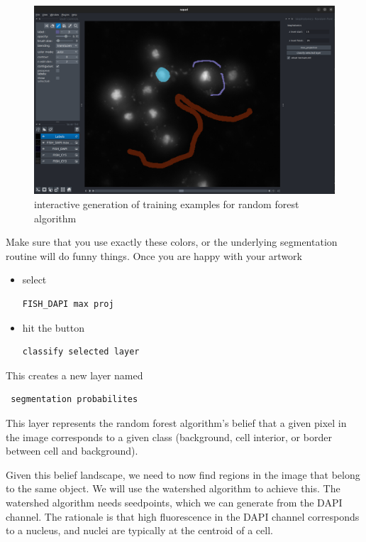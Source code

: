 \documentclass[11pt]{article} %
\begin{document}
\begin{figure}[H]
\includegraphics[width=14cm]{images/napari_viewer_6.png}
\caption{interactive generation of training examples for random forest algorithm}
\end{figure}

Make sure that you use exactly these colors, or the underlying segmentation routine will do funny things.
Once you are happy with your artwork
\begin{itemize}
\item select \begin{verbatim}FISH_DAPI max proj \end{verbatim}   
\item hit the button \begin{verbatim}classify selected layer\end{verbatim} 
\end{itemize}

This creates a new layer named \begin{verbatim} segmentation probabilites \end{verbatim}
This layer represents the random forest algorithm's belief that a given pixel in the image corresponds to a given class (background, cell interior, or border between cell and background).

Given this belief landscape, we need to now find regions in the image that belong to the same object. 
We will use the watershed algorithm to achieve this. 
The watershed algorithm needs seedpoints, which we can generate from the DAPI channel.
The rationale is that high fluorescence in the DAPI channel corresponds to a nucleus, and nuclei are typically at the centroid of a cell.
\end{document}
